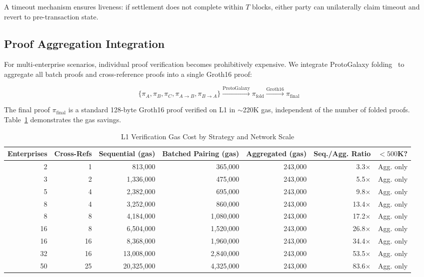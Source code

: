 \documentclass[conference]{IEEEtran}
\begin{document}
A timeout mechanism ensures liveness: if settlement does not complete within
$T$ blocks, either party can unilaterally claim timeout and revert to
pre-transaction state.

\subsection{Proof Aggregation Integration}
\label{sec:aggregation}

For multi-enterprise scenarios, individual proof verification becomes
prohibitively expensive. We integrate ProtoGalaxy folding~\cite{rul10} to
aggregate all batch proofs and cross-reference proofs into a single Groth16
proof:

\begin{equation}
  \{\pi_{A}, \pi_{B}, \pi_{C}, \pi_{A \rightarrow B}, \pi_{B \rightarrow A}\}
  \xrightarrow{\text{ProtoGalaxy}} \pi_{\text{fold}}
  \xrightarrow{\text{Groth16}} \pi_{\text{final}}
\end{equation}

The final proof $\pi_{\text{final}}$ is a standard 128-byte Groth16 proof
verified on L1 in $\sim$220K gas, independent of the number of folded proofs.
Table~\ref{tab:gas_scaling} demonstrates the gas savings.

\begin{table}[t]
  \centering
  \caption{L1 Verification Gas Cost by Strategy and Network Scale}
  \label{tab:gas_scaling}
  \begin{tabular}{@{}rrrrrrr@{}}
    \toprule
    \textbf{Enterprises} & \textbf{Cross-Refs} &
    \textbf{Sequential (gas)} & \textbf{Batched Pairing (gas)} &
    \textbf{Aggregated (gas)} & \textbf{Seq./Agg. Ratio} &
    \textbf{$< 500$K?} \\
    \midrule
    2  & 1  & 813,000    & 365,000   & 243,000 & 3.3$\times$  & Agg. only \\
    3  & 2  & 1,336,000  & 475,000   & 243,000 & 5.5$\times$  & Agg. only \\
    5  & 4  & 2,382,000  & 695,000   & 243,000 & 9.8$\times$  & Agg. only \\
    8  & 4  & 3,252,000  & 860,000   & 243,000 & 13.4$\times$ & Agg. only \\
    8  & 8  & 4,184,000  & 1,080,000 & 243,000 & 17.2$\times$ & Agg. only \\
    16 & 8  & 6,504,000  & 1,520,000 & 243,000 & 26.8$\times$ & Agg. only \\
    16 & 16 & 8,368,000  & 1,960,000 & 243,000 & 34.4$\times$ & Agg. only \\
    32 & 16 & 13,008,000 & 2,840,000 & 243,000 & 53.5$\times$ & Agg. only \\
    50 & 25 & 20,325,000 & 4,325,000 & 243,000 & 83.6$\times$ & Agg. only \\
    \bottomrule
  \end{tabular}
\end{table}
\end{document}
